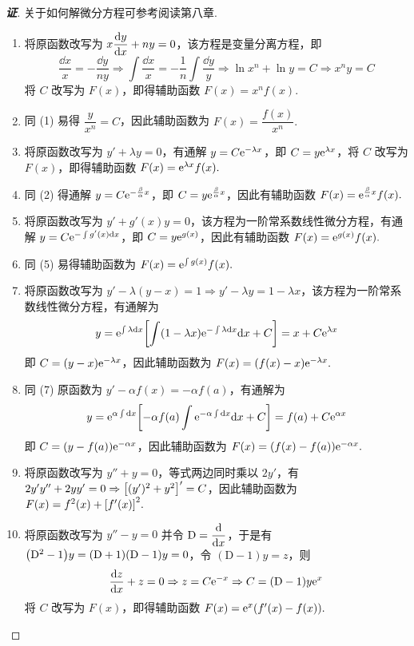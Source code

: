 \begin{proof}[{\songti \textbf{证}}]
    关于如何解微分方程可参考阅读第八章.
    \begin{enumerate}[label=(\arabic{*})]
        \item 将原函数改写为 $\displaystyle x\dv{y}{x}+ny=0$，该方程是变量分离方程，即
              $$\dfrac{\dd x}{x}=-\dfrac{\dd y}{ny}\Rightarrow \int\dfrac{\dd x}{x}=-\dfrac{1}{n}\int\dfrac{\dd y}{y}\Rightarrow\ln x^n+\ln y=C\Rightarrow x^ny=C$$
              将 $C$ 改写为 $F(x)$，即得辅助函数 $F(x)=x^nf(x)$.
        \item 同 (1) 易得 $\dfrac{y}{x^n}=C$，因此辅助函数为 $F(x)=\dfrac{f(x)}{x^n}.$
        \item 将原函数改写为 $y'+\lambda y=0$，有通解 $y=C\mathrm{e}^{-\lambda x}$，即 $C=y\mathrm{e}^{\lambda x}$，将 $C$ 改写为 $F(x)$，即得辅助函数 $F(x)=\mathrm{e}^{\lambda x}f(x).$
        \item 同 (2) 得通解 $y=C\mathrm{e}^{-\frac{\beta}{\alpha}x}$，即 $C=y\mathrm{e}^{\frac{\beta}{\alpha}x}$，因此有辅助函数 $F(x)=\mathrm{e}^{\frac{\beta}{\alpha}x}f(x).$
        \item 将原函数改写为 $y'+g'(x)y=0$，该方程为一阶常系数线性微分方程，有通解 $y=C\mathrm{e}^{-\int g'(x)\dd x}$，即 $C=y\mathrm{e}^{g(x)}$，因此有辅助函数 $F(x)=\mathrm{e}^{g(x)}f(x).$
        \item 同 (5) 易得辅助函数为 $F(x)=\mathrm{e}^{\int g(x)}f(x).$
        \item 将原函数改写为 $y'-\lambda(y-x)=1\Rightarrow y'-\lambda y=1-\lambda x$，该方程为一阶常系数线性微分方程，有通解为
              $$y=\mathrm{e}^{\int\lambda\dd x}\qty[\int(1-\lambda x)\mathrm{e}^{-\int\lambda\dd  x}\dd x+C]=x+C\mathrm{e}^{\lambda x}$$
              即 $C=(y-x)\mathrm{e}^{-\lambda x}$，因此辅助函数为 $F(x)=(f(x)-x)\mathrm{e}^{-\lambda x}.$
        \item 同 (7) 原函数为 $y'-\alpha f(x)=-\alpha f(a)$，有通解为
              $$y=\mathrm{e}^{\alpha\int\dd x}\qty[-\alpha f(a)\int\mathrm{e}^{-\alpha \int\dd x}\dd x+C]=f(a)+C\mathrm{e}^{\alpha x}$$
              即 $C=(y-f(a))\mathrm{e}^{-\alpha x}$，因此辅助函数为 $F(x)=(f(x)-f(a))\mathrm{e}^{-\alpha x}.$
        \item 将原函数改写为 $y''+y=0$，等式两边同时乘以 $2y'$，有 $2y'y''+2yy'=0\Rightarrow \qty[(y')^2+y^2]'=C$，因此辅助函数为 $F(x)=f^2(x)+\qty[f'(x)]^2.$
        \item 将原函数改写为 $y''-y=0$ 并令 $\displaystyle \mathrm{D}=\dv{x}$，于是有 $\qty(\mathrm{D}^2-1)y=(\mathrm{D}+1)(\mathrm{D}-1)y=0$，令 $(\mathrm{D}-1)y=z$，则
              $$\dv{z}{x}+z=0\Rightarrow z=C\mathrm{e}^{-x}\Rightarrow C=(\mathrm{D}-1)y\mathrm{e}^{x}$$
              将 $C$ 改写为 $F(x)$，即得辅助函数 $F(x)=\mathrm{e}^{x}(f'(x)-f(x)).$
    \end{enumerate}
\end{proof}

